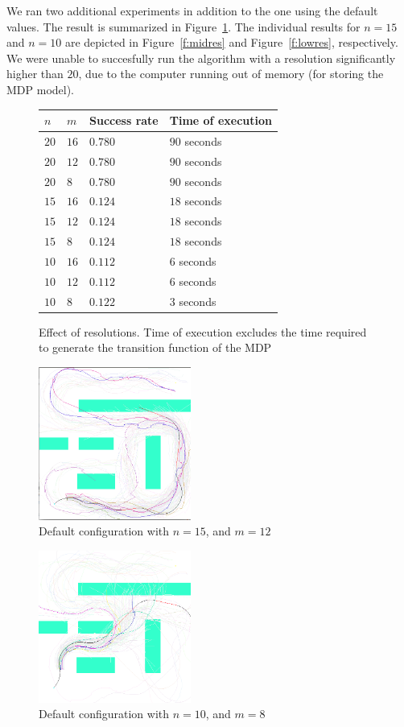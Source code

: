 \documentclass[a4paper]{article}
\begin{document}
We ran two additional experiments in addition to the one using the default
values. The result is summarized in Figure~\ref{f:resolution}.
The individual results for $n=15$ and $n=10$ are depicted in Figure~\ref{f:midres} and Figure~\ref{f:lowres},
respectively. We were unable
to succesfully run the algorithm with a resolution significantly higher than
$20$, due to the computer running out of memory (for storing the MDP model).

\begin{figure}
\label{f:resolution}
\caption{Effect of resolutions. Time of execution excludes the time required
         to generate the transition function of the MDP}
\begin{tabular}{ l | l | l | l }
  $n$ & $m$ & Success rate & Time of execution \\ \hline \hline
  $20$ & $16$ & $0.780$ & $90$ seconds \\ \hline
  $20$ & $12$ & $0.780$ & $90$ seconds \\ \hline
  $20$ & $8$ & $0.780$ & $90$ seconds \\ \hline
  $15$ & $16$ & $0.124$ & $18$ seconds \\ \hline
  $15$ & $12$ & $0.124$ & $18$ seconds \\ \hline
  $15$ & $8$ & $0.124$ & $18$ seconds \\ \hline
  $10$ & $16$ & $0.112$ & $6$ seconds \\ \hline
  $10$ & $12$ & $0.112$ & $6$ seconds \\ \hline
  $10$ & $8$ & $0.122$ & $3$ seconds \\ \hline
\end{tabular}
\end{figure}

\begin{figure}
\label{f:b}
\caption{Default configuration with $n=15$, and $m=12$}
\centerline{\includegraphics[width=5cm]{b_medres.png}}
\end{figure}

\begin{figure}
\label{f:b}
\caption{Default configuration with $n=10$, and $m=8$}
\centerline{\includegraphics[width=5cm]{b_lowres.png}}
\end{figure}
\end{document}
